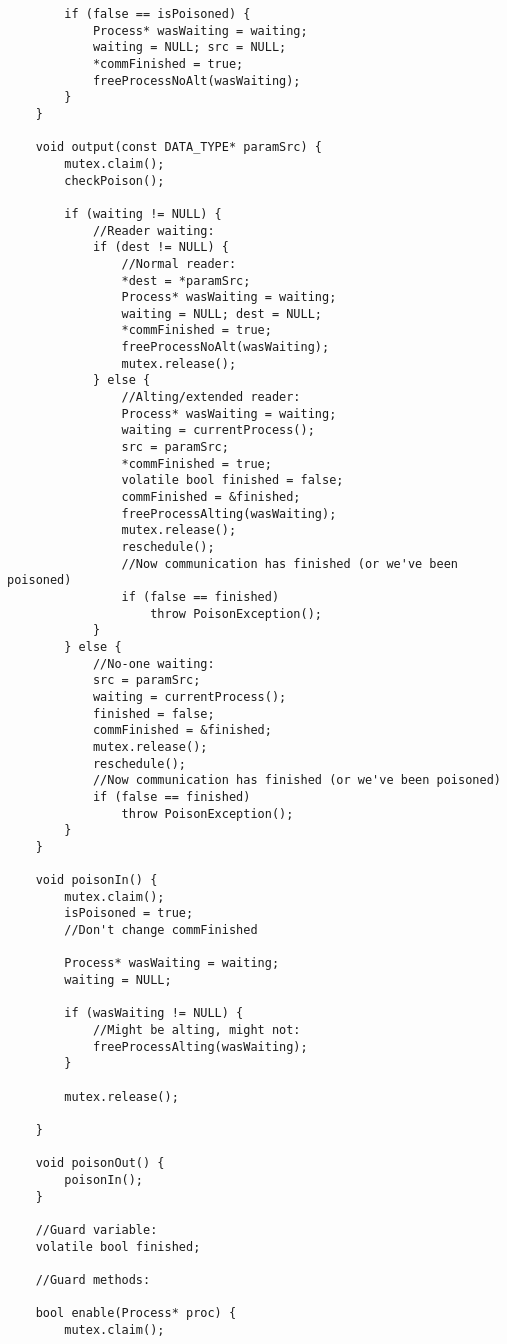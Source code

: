 \documentclass{article}
\begin{document}
{\begin{verbatim}
        if (false == isPoisoned) {
            Process* wasWaiting = waiting;
            waiting = NULL; src = NULL;
            *commFinished = true;
            freeProcessNoAlt(wasWaiting);
        }
    }

    void output(const DATA_TYPE* paramSrc) {
        mutex.claim();
        checkPoison();

        if (waiting != NULL) {
            //Reader waiting:
            if (dest != NULL) {
                //Normal reader:
                *dest = *paramSrc;
                Process* wasWaiting = waiting;
                waiting = NULL; dest = NULL;
                *commFinished = true;
                freeProcessNoAlt(wasWaiting);
                mutex.release();
            } else {
                //Alting/extended reader:
                Process* wasWaiting = waiting;
                waiting = currentProcess();
                src = paramSrc;
                *commFinished = true;
                volatile bool finished = false;
                commFinished = &finished;
                freeProcessAlting(wasWaiting);
                mutex.release();
                reschedule();
                //Now communication has finished (or we've been poisoned)
                if (false == finished)
                    throw PoisonException();
            }
        } else {
            //No-one waiting:
            src = paramSrc;
            waiting = currentProcess();
            finished = false;
            commFinished = &finished;
            mutex.release();
            reschedule();
            //Now communication has finished (or we've been poisoned)
            if (false == finished)
                throw PoisonException();
        }
    }

    void poisonIn() {
        mutex.claim();
        isPoisoned = true;
        //Don't change commFinished
        
        Process* wasWaiting = waiting;
        waiting = NULL;

        if (wasWaiting != NULL) {
            //Might be alting, might not:
            freeProcessAlting(wasWaiting);
        }

        mutex.release();

    }

    void poisonOut() {
        poisonIn();
    }
    
    //Guard variable:
    volatile bool finished;

    //Guard methods:
    
    bool enable(Process* proc) {
        mutex.claim();


\end{verbatim}}
\end{document}
